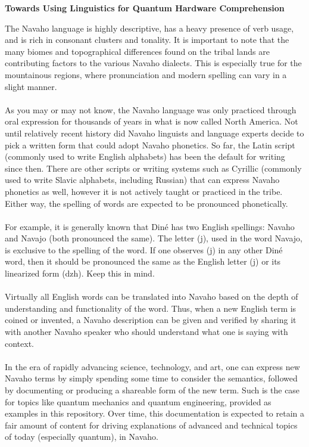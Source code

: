 \begin{center}
\Large\textbf{Towards Using Linguistics for Quantum Hardware Comprehension}
\end{center}

\large{
The Navaho language is highly descriptive, has a heavy presence of verb usage, and is rich in consonant clusters and tonality. It is important to note that the many biomes and topographical differences found on the tribal lands are contributing factors to the various Navaho dialects. This is especially true for the mountainous regions, where pronunciation and modern spelling can vary in a slight manner.
\\ 
\space
\\
\indent 
As you may or may not know, the Navaho language was only practiced through oral expression for thousands of years in what is now called North America. Not until relatively recent history did Navaho linguists and language experts decide to pick a written form that could adopt Navaho phonetics. So far, the Latin script (commonly used to write English alphabets) has been the default for writing since then. There are other scripts or writing systems such as Cyrillic (commonly used to write Slavic alphabets, including Russian) that can express Navaho phonetics as well, however it is not actively taught or practiced in the tribe. Either way, the spelling of words are expected to be pronounced phonetically.
\\ 
\space
\\
\indent 
For example, it is generally known that Diné has two English spellings: Navaho and Navajo (both pronounced the same). The letter (j), used in the word Navajo, is exclusive to the spelling of the word. If one observes (j) in any other Diné word, then it should be pronounced the same as the English letter (j) or its linearized form (dzh). Keep this in mind.
\\ 
\space
\\
\indent 
Virtually all English words can be translated into Navaho based on the depth of understanding and functionality of the word. Thus, when a new English term is coined or invented, a Navaho description can be given and verified by sharing it with another Navaho speaker who should understand what one is saying with context.
\\ 
\space
\\
\indent
In the era of rapidly advancing science, technology, and art, one can express new Navaho terms by simply spending some time to consider the semantics, followed by documenting or producing a shareable form of the new term. Such is the case for topics like quantum mechanics and quantum engineering, provided as examples in this repository. Over time, this documentation is expected to retain a fair amount of content for driving explanations of advanced and technical topics of today (especially quantum), in Navaho.
} 
